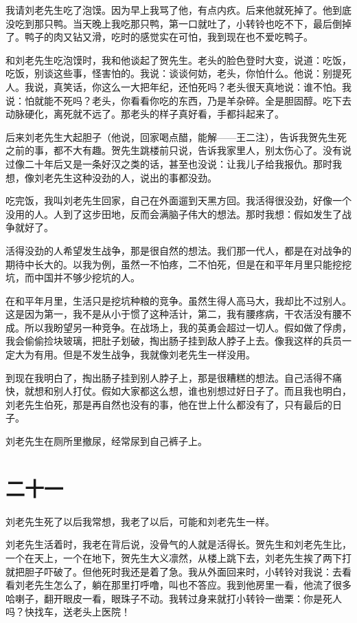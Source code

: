 我请刘老先生吃了泡馍。因为早上我骂了他，有点内疚。后来他就死掉了。他到底没吃到那只鸭。当天晚上我吃那只鸭，第一口就吐了，小转铃也吃不下，最后倒掉了。鸭子的肉又钻又滑，吃时的感觉实在可怕，我到现在也不爱吃鸭子。 

和刘老先生吃泡馍时，我和他谈起了贺先生。老头的脸色登时大变，说道：吃饭，吃饭，别谈这些事，怪害怕的。我说：谈谈何妨，老头，你怕什么。他说：别提死人。我说，真笑话，你这么一大把年纪，还怕死吗？老头很天真地说：谁不怕。我说：怕就能不死吗？老头，你看看你吃的东西，乃是羊杂碎。全是胆固醇。吃下去动脉硬化，离死就不远了。那老头的样子真好看，手都抖起来了。 

后来刘老先生大起胆子（他说，回家喝点醋，能解——王二注），告诉我贺先生死之前的事，都不大有趣。贺先生跳楼前只说，告诉我家里人，别太伤心了。没有说过像二十年后又是一条好汉之类的话，甚至也没说：让我儿子给我报仇。那时我想，像刘老先生这种没劲的人，说出的事都没劲。 

吃完饭，我叫刘老先生回家，自己在外面遛到天黑方回。我活得很没劲，好像一个没用的人。人到了这步田地，反而会满脑子伟大的想法。那时我想：假如发生了战争就好了。 

活得没劲的人希望发生战争，那是很自然的想法。我们那一代人，都是在对战争的期待中长大的。以我为例，虽然一不怕疼，二不怕死，但是在和平年月里只能挖挖坑，而中国并不够少挖坑的人。 

在和平年月里，生活只是挖坑种粮的竞争。虽然生得人高马大，我却比不过别人。这是因为第一，我不是从小于惯了这种活计，第二，我有腰疼病，干农活没有腰不成。所以我盼望另一种竞争。在战场上，我的英勇会超过一切人。假如做了俘虏，我会偷偷捡块玻璃，把肚子划破，掏出肠子挂到敌人脖子上去。像我这样的兵员一定大为有用。但是不发生战争，我就像刘老先生一样没用。 

到现在我明白了，掏出肠子挂到别人脖子上，那是很糟糕的想法。自己活得不痛快，就想和别人打仗。假如大家都这么想，谁也别想过好日子了。而且我也明白，刘老先生伯死，那是再自然也没有的事，他在世上什么都没有了，只有最后的日子。 

刘老先生在厕所里撤尿，经常尿到自己裤子上。

\section{二十一}

刘老先生死了以后我常想，我老了以后，可能和刘老先生一样。 

刘老先生活着时，我老在背后说，没骨气的人就是活得长。贺先生和刘老先生比，一个在天上，一个在地下，贺先生大义凛然，从楼上跳下去，刘老先生挨了两下打就把胆子吓破了。但他死时我还是着了急。我从外面回来时，小转铃对我说：去看看刘老先生怎么了，躺在那里打呼噜，叫也不答应。我到他房里一看，他流了很多哈喇子，翻开眼皮一看，眼珠子不动。我转过身来就打小转铃一凿栗：你是死人吗？快找车，送老头上医院！ 

